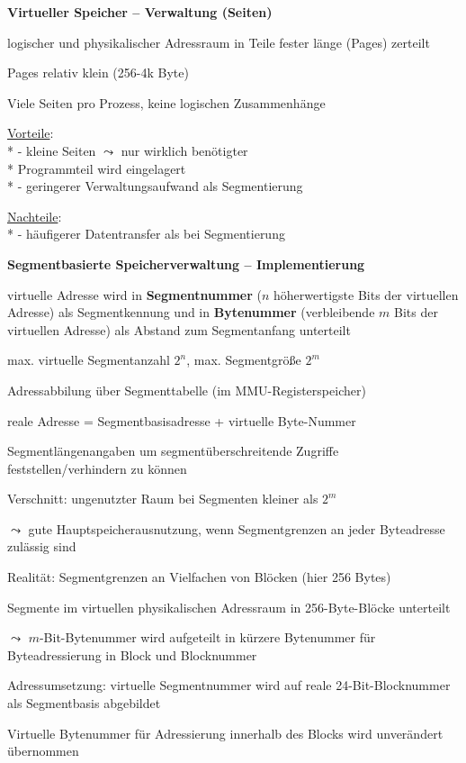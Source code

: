 \textbf{Virtueller Speicher -- Verwaltung (Seiten)}
\begin{items}
  \item logischer und physikalischer Adressraum in Teile fester länge (Pages) zerteilt
  \item Pages relativ klein (256-4k Byte)
  \item Viele Seiten pro Prozess, keine logischen Zusammenhänge
  \item \underline{Vorteile}: \\*
    - kleine Seiten \( \leadsto \) nur wirklich benötigter \\* \phantom{-} Programmteil wird eingelagert \\*
    - geringerer Verwaltungsaufwand als Segmentierung
  \item \underline{Nachteile}: \\*
    - häufigerer Datentransfer als bei Segmentierung
\end{items}

\textbf{Segmentbasierte Speicherverwaltung -- Implementierung}
\begin{items}
  \item virtuelle Adresse wird in \textbf{Segmentnummer} (\( n \) höherwertigste Bits der virtuellen Adresse) als Segmentkennung und in \textbf{Bytenummer} (verbleibende \( m \) Bits der virtuellen Adresse) als Abstand zum Segmentanfang unterteilt
  \item max. virtuelle Segmentanzahl \( 2^n \), max. Segmentgröße \( 2^m \)
  \item Adressabbilung über Segmenttabelle (im MMU-Registerspeicher)
  \item reale Adresse = Segmentbasisadresse + virtuelle Byte-Nummer
  \item Segmentlängenangaben um segmentüberschreitende Zugriffe feststellen/verhindern zu können
  \item Verschnitt: ungenutzter Raum bei Segmenten kleiner als \( 2^m \)
  \item \( \leadsto \) gute Hauptspeicherausnutzung, wenn Segmentgrenzen an jeder Byteadresse zulässig sind
  \item Realität: Segmentgrenzen an Vielfachen von Blöcken (hier 256 Bytes)
  \item Segmente im virtuellen physikalischen Adressraum in 256-Byte-Blöcke unterteilt
  \item \( \leadsto \) \( m \)-Bit-Bytenummer wird aufgeteilt in kürzere Bytenummer für Byteadressierung in Block und Blocknummer
  \item Adressumsetzung: virtuelle Segmentnummer wird auf reale 24-Bit-Blocknummer als Segmentbasis abgebildet
  \item Virtuelle Bytenummer für Adressierung innerhalb des Blocks wird unverändert übernommen
\end{items}

